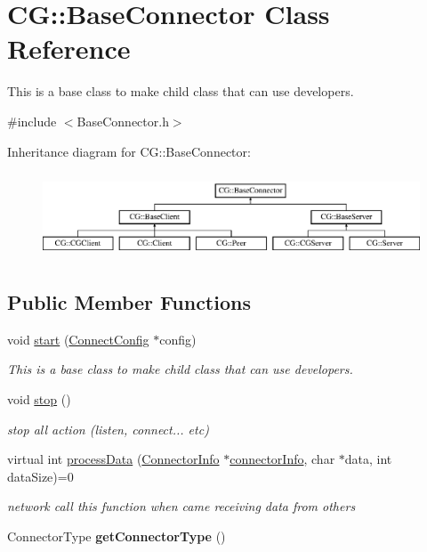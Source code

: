 \hypertarget{class_c_g_1_1_base_connector}{}\section{CG\+:\+:Base\+Connector Class Reference}
\label{class_c_g_1_1_base_connector}


This is a base class to make child class that can use developers.  




{\ttfamily \#include $<$Base\+Connector.\+h$>$}

Inheritance diagram for CG\+:\+:Base\+Connector\+:\begin{figure}[H]
\begin{center}
\leavevmode
\includegraphics[height=2.564885cm]{class_c_g_1_1_base_connector}
\end{center}
\end{figure}
\subsection*{Public Member Functions}
\begin{DoxyCompactItemize}
\item 
void \mbox{\hyperlink{class_c_g_1_1_base_connector_a16247e8292b28ba8a3017d86dfc30d15}{start}} (\mbox{\hyperlink{class_c_g_1_1_connect_config}{Connect\+Config}} $\ast$config)
\begin{DoxyCompactList}\small\item\em This is a base class to make child class that can use developers. \end{DoxyCompactList}\item 
void \mbox{\hyperlink{class_c_g_1_1_base_connector_abd3e4f816a311c41418d5e090de2de15}{stop}} ()
\begin{DoxyCompactList}\small\item\em stop all action (listen, connect... etc) \end{DoxyCompactList}\item 
virtual int \mbox{\hyperlink{class_c_g_1_1_base_connector_adf8eae41d668ead0f14e7f86b3cea825}{process\+Data}} (\mbox{\hyperlink{class_c_g_1_1_connector_info}{Connector\+Info}} $\ast$\mbox{\hyperlink{class_c_g_1_1_base_connector_ae68321ba56404549f2e655238035ed8d}{connector\+Info}}, char $\ast$data, int data\+Size)=0
\begin{DoxyCompactList}\small\item\em network call this function when came receiving data from others \end{DoxyCompactList}\item 
\mbox{\label{class_c_g_1_1_base_connector_a92b1055389fbe5720d6671c29b80b110}} 
Connector\+Type {\bfseries get\+Connector\+Type} ()
\end{DoxyCompactItemize}

